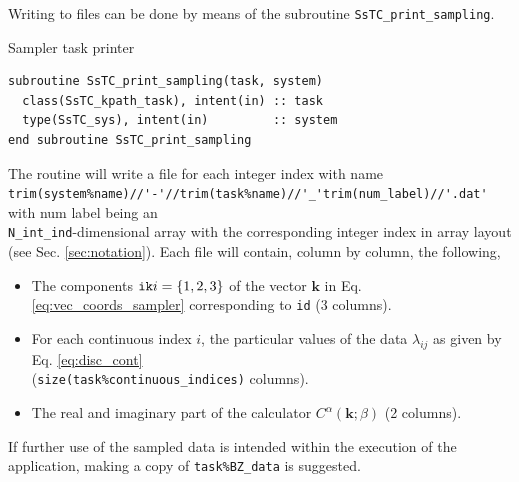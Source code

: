 \documentclass[10pt,a4paper]{article}
\begin{document}
Writing to files can be done by means of the subroutine \verb|SsTC_print_sampling|.
\begin{codebox}{Sampler task printer}
\begin{lstlisting}[caption={Interface of the ``sampler" printer.},captionpos=b]
subroutine SsTC_print_sampling(task, system)
  class(SsTC_kpath_task), intent(in) :: task
  type(SsTC_sys), intent(in)         :: system
end subroutine SsTC_print_sampling
\end{lstlisting}
\end{codebox}
The routine will write a file for each integer index with name \\ \verb|trim(system%name)//'-'//trim(task%name)//'_'trim(num_label)//'.dat'| with num label being an \\ \verb|N_int_ind|-dimensional array with the corresponding integer index in array layout (see Sec. \ref{sec:notation}). Each file will contain, column by column, the following,
\begin{tcolorbox}
\begin{itemize}
\item The components $\verb|ik|i=\{1, 2, 3\}$ of the vector $\bm{k}$ in Eq. \eqref{eq:vec_coords_sampler} corresponding to \verb|id| (3 columns).
\item For each continuous index $i$, the particular values of the data $\lambda_{ij}$ as given by Eq. \eqref{eq:disc_cont} \\ (\verb|size(task%continuous_indices)| columns).
\item The real and imaginary part of the calculator $C^{\alpha}(\bm{k};\beta)$ (2 columns).
\end{itemize}
\end{tcolorbox}
If further use of the sampled data is intended within the execution of the application, making a copy of \verb|task%BZ_data| is suggested.
\end{document}
